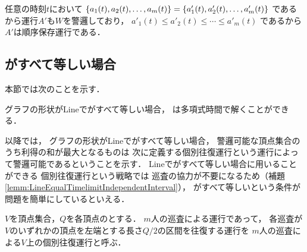 任意の時刻$t$において
$\left\{{ a_1(t), a_2(t), \ldots, a_m(t) }\right\} = \left\{{ a'_1(t), a'_2(t), \ldots, a'_m(t) }\right\}$
であるから運行$A'$も$W$を警邏しており，
%
$a'_1(t) \leq a'_2(t) \leq \cdots \leq a'_m(t)$
であるから$A'$は順序保存運行である．









\subsection{{\timelimit}がすべて等しい場合}
\label{subsec:LineUnaryTimelimit}




本節では次のことを示す．

\begin{theo}
    \label{theo:LineEqualTimelimit}
    グラフの形状がLineで{\timelimit}がすべて等しい場合，
    {\patrolling}は多項式時間で解くことができる．
\end{theo}


以降では，
グラフの形状がLineで{\timelimit}がすべて等しい場合，
警邏可能な頂点集合のうち利得の和が最大となるものは
次に定義する個別往復運行という運行によって警邏可能であるということを示す．
Lineで{\timelimit}がすべて等しい場合に用いることができる
個別往復運行という戦略では
巡査の協力が不要になるため（補題\ref{lemm:LineEqualTimelimitIndependentInterval}），
{\timelimit}がすべて等しいという条件が問題を簡単にしているといえる．



\begin{defi}
    $V$を頂点集合，$Q$を各頂点の{\timelimit}とする．
    $m$人の巡査による運行であって，
    各巡査が$V$のいずれかの頂点を左端とする長さ$Q/2$の区間を往復する運行を
    $m$人の巡査による$V$上の個別往復運行と呼ぶ．
\end{defi}




